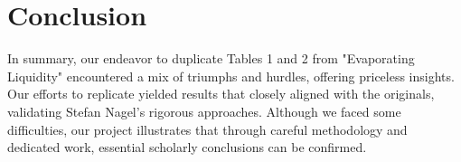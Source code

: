 \documentclass[11pt]{article}
\begin{document}
\section{Conclusion}
In summary, our endeavor to duplicate Tables 1 and 2 from "Evaporating Liquidity" encountered a mix of triumphs and hurdles, 
offering priceless insights. Our efforts to replicate yielded results that closely aligned with the originals, 
validating Stefan Nagel's rigorous approaches. Although we faced some difficulties, 
our project illustrates that through careful methodology and dedicated work, essential scholarly conclusions can be confirmed.


\newpage


\end{document}
